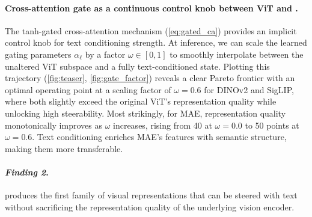\paragraph{Cross-attention gate as a continuous control knob between ViT and \model{}.}
The tanh-gated cross-attention mechanism (\cref{eq:gated_ca}) provides an implicit control knob for
text conditioning strength.
At inference, we can scale the learned gating parameters $\alpha_\ell$ by a factor $\omega \in [0, 1]$ to smoothly interpolate between the unaltered ViT subspace and a fully text-conditioned state.
Plotting this trajectory (\cref{fig:teaser}, \cref{fig:gate_factor}) reveals a clear Pareto frontier with an optimal operating point at a scaling factor of $\omega {=} 0.6$ for DINOv2 and SigLIP, where both slightly exceed the original ViT's representation quality while unlocking high steerability.
Most strikingly, for MAE, 
representation quality monotonically improves as $\omega$ increases, rising from 40 at $\omega{=}0.0$ to 50 points at $\omega{=}0.6$.
Text conditioning enriches MAE's features with semantic structure, making them more transferable.


\iffindingbox
\begin{tcolorbox}[colback=\findingcolor,
colframe=black, arc=4pt, boxsep=1pt]
\paragraph{\textbf{\textit{Finding 2}.}}
\model{} produces the first family of visual representations that can be steered with text 
without sacrificing
the representation quality of the underlying vision encoder.
\end{tcolorbox}
\fi

